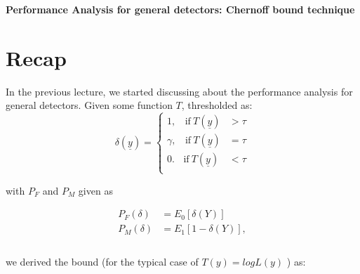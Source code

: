 \documentclass[12pt]{report}
\begin{document}
\maketitle

\begin{center}
{\Large \bf Performance Analysis for general detectors: Chernoff bound technique}
\end{center}
	
	

\section{Recap}
In the previous lecture, we started discussing about the performance analysis for general detectors. Given some function $T$, thresholded as:
            \begin{equation}
                    \delta(\underline{y}) =  
                         \begin{cases}
                               1, \ \ \ \  \mbox{if}~T(\underline{y})&> \tau  \\
                               \gamma,  \ \ \ \  \mbox{if}~T(\underline{y})&= \tau  \\
                                0. \ \ \ \  \mbox{if}~T(\underline{y})&< \tau  \\
                          \end{cases}
                \end{equation}


\noindent with $P_F$ and $P_M$ given as

            \begin{equation}
            \begin{aligned}
                    P_F(\delta)&=E_0 [\delta(Y)]  \\
                   P_M(\delta)&=E_1 [1-\delta(Y)],\\\\
            \end{aligned}
            \end{equation}



\noindent we derived the bound (for the typical case of $T(y) = log L(y)$ ) as:
\end{document}
